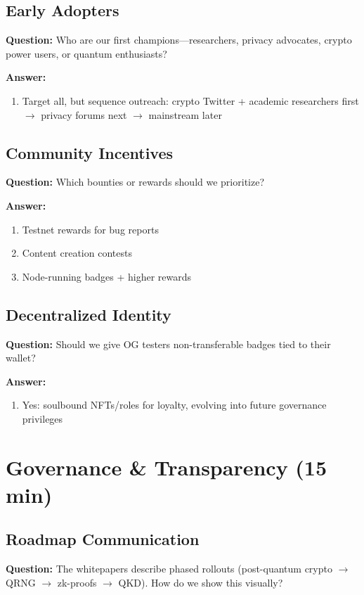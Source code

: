 \documentclass[11pt,a4paper]{article}
\begin{document}
\subsection{Early Adopters}
\textbf{Question:} Who are our first champions—researchers, privacy advocates, crypto power users, or quantum enthusiasts?

\textbf{Answer:}
\begin{enumerate}
\item Target all, but sequence outreach: crypto Twitter + academic researchers first $\rightarrow$ privacy forums next $\rightarrow$ mainstream later
\end{enumerate}

\subsection{Community Incentives}
\textbf{Question:} Which bounties or rewards should we prioritize?

\textbf{Answer:}
\begin{enumerate}
\item Testnet rewards for bug reports
\item Content creation contests
\item Node-running badges + higher rewards
\end{enumerate}

\subsection{Decentralized Identity}
\textbf{Question:} Should we give OG testers non-transferable badges tied to their wallet?

\textbf{Answer:}
\begin{enumerate}
\item Yes: soulbound NFTs/roles for loyalty, evolving into future governance privileges
\end{enumerate}

\section{Governance \& Transparency (15 min)}

\subsection{Roadmap Communication}
\textbf{Question:} The whitepapers describe phased rollouts (post-quantum crypto $\rightarrow$ QRNG $\rightarrow$ zk-proofs $\rightarrow$ QKD). How do we show this visually?
\end{document}
